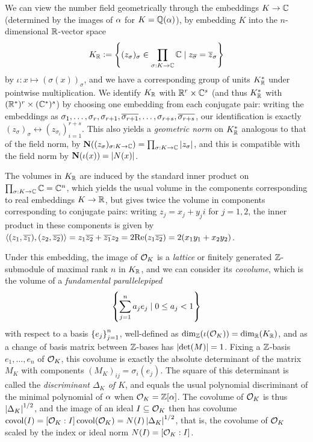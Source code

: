 \documentclass[11pt]{report}
\begin{document}
We can view the number field geometrically through the embeddings $K \to \mathbb{C}$ (determined by the images of $\alpha$ for $K = \mathbb{Q}(\alpha)$), by embedding $K$ into the $n$-dimensional $\mathbb{R}$-vector space 
$$
    K_{\mathbb{R}} \vcentcolon= \left\{  (z_\sigma)_{\sigma} \in \prod_{\sigma : K \to \mathbb{C}}\mathbb{C} \mid z_{\overline{\sigma}} = \overline{z}_\sigma  \right\}
$$
by $\iota : x \mapsto (\sigma(x))_{\sigma}$, and we have a corresponding group of units $K_{\mathbb{R}}^*$ under pointwise multiplication. We identify $K_{\mathbb{R}}$ with $\mathbb{R}^r \times \mathbb{C}^s$ (and thus $K_{\mathbb{R}}^*$ with $(\mathbb{R}^*)^r \times (\mathbb{C}^*)^s$) by choosing one embedding from each conjugate pair: writing the embeddings as $\sigma_1, \ldots, \sigma_r, \sigma_{r + 1}, \overline{\sigma_{r + 1}}, \ldots, \sigma_{r + s}, \overline{\sigma_{r + s}}$, our identification is exactly $(z_\sigma)_\sigma \leftrightarrow (z_{\sigma_i})_{i = 1}^{r + s}$. This also yields a \hypertarget{geomnorm}{\emph{geometric norm}} on $K_{\mathbb{R}}^*$ analogous to that of the field norm, by $\operatorname{\mathbf{N}}((z_\sigma)_{\sigma : K \to \mathbb{C}}) = \prod_{\sigma : K \to \mathbb{C}}\left| z_\sigma \right|$, and this is compatible with the field norm by $\operatorname{\mathbf{N}}(\iota(x)) = \left| N(x) \right|$.

The volumes in $K_{\mathbb{R}}$ are induced by the standard inner product on $\prod_{\sigma : K \to \mathbb{C}}\mathbb{C} = \mathbb{C}^n$, which yields the usual volume in the components corresponding to real embeddings $K \to \mathbb{R}$, but gives twice the volume in components corresponding to conjugate pairs: writing $z_j = x_j + y_ji$ for $j = 1, 2$, the inner product in these components is given by $\left\langle (z_1, \overline{z_1}), (z_2, \overline{z_2}) \right\rangle = z_1\overline{z_2} + \overline{z_1}z_2 = 2\text{Re}(z_1\overline{z_2}) = 2(x_1y_1 + x_2y_2)$.


Under this embedding, the image of $\mathcal{O}_K$ is a \emph{lattice} or finitely generated $\mathbb{Z}$-submodule of maximal rank $n$ in $K_{\mathbb{R}}$, and we can consider its \emph{covolume}, which is the volume of a \emph{fundamental parallelepiped} 
$$
    \left\{  \sum_{j = 1}^na_je_j \mid 0 \leq a_j < 1  \right\}
$$
with respect to a basis $\left\{  e_j  \right\}_{j = 1}^n$, well-defined as $\dim_{\mathbb{Z}}(\iota(\mathcal{O}_K)) = \dim_{\mathbb{R}}(K_{\mathbb{R}})$, and as a change of basis matrix between $\mathbb{Z}$-bases has $\left| \det(M) \right| = 1$. Fixing a $\mathbb{Z}$-basis $e_1, \ldots, e_n$ of $\mathcal{O}_K$, this covolume is exactly the absolute determinant of the matrix $M_K$ with components $(M_K)_{ij} = \sigma_i(e_j)$. The square of this determinant is called the \emph{discriminant $\Delta_K$ of $K$}, and equals the usual polynomial discriminant of the minimal polynomial of $\alpha$ when $\mathcal{O}_K = \mathbb{Z}[\alpha]$. The covolume of $\mathcal{O}_K$ is thus $\left| \Delta_K \right|^{1/2}$, and the image of an ideal $I \subseteq \mathcal{O}_K$ then has covolume $\operatorname{covol}(I) = [\mathcal{O}_K : I]\operatorname{covol}(\mathcal{O}_K) = N(I)\left| \Delta_K \right|^{1/2}$, that is, the covolume of $\mathcal{O}_K$ scaled by the index or ideal norm $N(I) = [\mathcal{O}_K : I]$.
\end{document}

